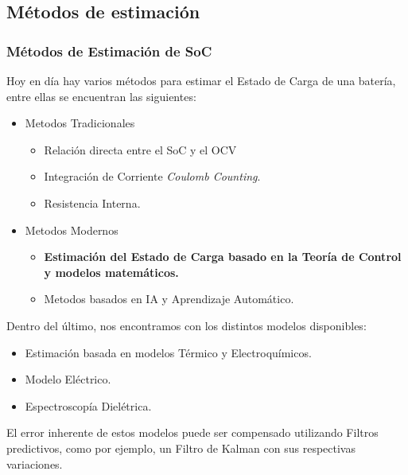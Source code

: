 \documentclass[10pt]{beamer}
\theoremstyle{remark}
\theoremstyle{definition}
\begin{document}
\subsection{Métodos de estimación}
\begin{frame}[allowframebreaks]
	\frametitle{Métodos de Estimación de SoC}
  	Hoy en día hay varios métodos para estimar el Estado de Carga de una batería,
  	entre ellas se encuentran las siguientes:
  	\begin{itemize}
        \item Metodos Tradicionales
            \begin{itemize}
                \item 	Relación directa entre el SoC y el OCV
                \item 	Integración de Corriente \emph{Coulomb Counting}.
                \item 	Resistencia Interna.
            \end{itemize}
        \item Metodos Modernos
            \begin{itemize}
                \item 	\textbf{Estimación del Estado de Carga basado en la Teor\'ia de
                    Control y modelos matemáticos.}
                \item 	Metodos basados en IA y Aprendizaje Automático.
            \end{itemize}
  	\end{itemize}
	\framebreak
  	Dentro del último, nos encontramos con los distintos modelos disponibles:
  	\begin{itemize}
		\item	Estimación basada en modelos Térmico y Electroquímicos.
		\item	Modelo Eléctrico.
		\item 	Espectroscopía Dielétrica.
  	\end{itemize}
  	El error inherente de estos modelos puede ser compensado utilizando Filtros
  	predictivos, como por ejemplo, un Filtro de Kalman con sus respectivas
  	variaciones.
\end{frame}
\end{document}
